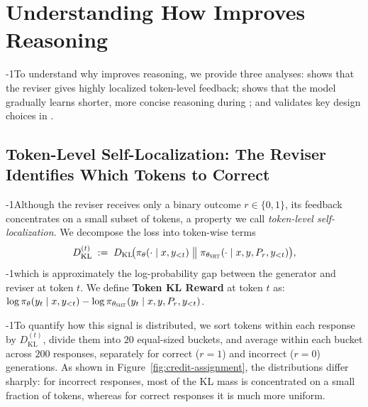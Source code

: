 
\section{Understanding How \ours{} Improves Reasoning}


\looseness-1To understand why \ours{} improves reasoning, we provide three analyses:  shows that the reviser gives highly localized token-level feedback;  shows that the model gradually learns shorter, more concise reasoning during \ours{}; and  validates key design choices in \ours{}.

\subsection{Token-Level Self-Localization: The Reviser Identifies Which Tokens to Correct}
\label{sec:credit-assignment}


\looseness-1Although the reviser receives only a binary outcome \(r \in \{0,1\}\), its feedback concentrates on a small subset of tokens, a property we call \emph{token-level self-localization}. We decompose the \opsd{} loss into token-wise terms
\[
D_{\mathrm{KL}}^{(t)} \;:=\; 
D_{\mathrm{KL}}\!\bigl(\pi_\theta(\cdot \mid x, y_{<t}) \;\big\|\; \pi_{\theta_{\textsc{SRT}{}}}(\cdot \mid x, y, P_r, y_{<t})\bigr),
\]
\looseness-1which is approximately the log-probability gap between the generator and reviser at token \(t\). We define \textbf{Token KL Reward} at token \(t\) as: $\log \pi_\theta(y_t \mid x, y_{<t}) - \log \pi_{\theta_{\textsc{SRT}{}}}(y_t \mid x, y, P_r, y_{<t})$.

\looseness-1To quantify how this signal is distributed, we sort tokens within each response by \(D_{\mathrm{KL}}^{(t)}\), divide them into \(20\) equal-sized buckets, and average within each bucket across $200$ responses, separately for correct (\(r=1\)) and incorrect (\(r=0\)) generations. As shown in Figure~\ref{fig:credit-assignment}, the distributions differ sharply: for incorrect responses, most of the KL mass is concentrated on a small fraction of tokens, whereas for correct responses it is much more uniform.

